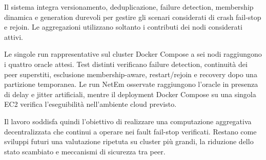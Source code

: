 \documentclass[conference]{IEEEtran}
\begin{document}
Il sistema integra versionamento, deduplicazione, failure detection, membership dinamica e generation durevoli per gestire gli scenari considerati di crash fail-stop e rejoin. Le aggregazioni utilizzano soltanto i contributi dei nodi considerati attivi.

Le singole run rappresentative sul cluster Docker Compose a sei nodi raggiungono i quattro oracle attesi. Test distinti verificano failure detection, continuità dei peer superstiti, esclusione membership-aware, restart/rejoin e recovery dopo una partizione temporanea. Le run NetEm osservate raggiungono l'oracle in presenza di delay e jitter artificiali, mentre il deployment Docker Compose su una singola EC2 verifica l'eseguibilità nell'ambiente cloud previsto.

Il lavoro soddisfa quindi l'obiettivo di realizzare una computazione aggregativa decentralizzata che continui a operare nei fault fail-stop verificati. Restano come sviluppi futuri una valutazione ripetuta su cluster più grandi, la riduzione dello stato scambiato e meccanismi di sicurezza tra peer.

\balance

\end{document}
